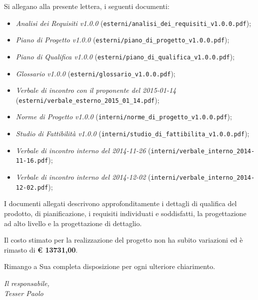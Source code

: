 \documentclass[10pt,a4paper,sans]{moderncv}        %
\begin{document}
Si allegano alla presente lettera, i seguenti documenti:
	\begin{itemize}
		\item \textit{Analisi dei Requisiti v1.0.0} ({\verb!esterni/analisi_dei_requisiti_v1.0.0.pdf!});
		\item \textit{Piano di Progetto v1.0.0} ({\verb!esterni/piano_di_progetto_v1.0.0.pdf!});
		\item \textit{Piano di Qualifica v1.0.0} ({\verb!esterni/piano_di_qualifica_v1.0.0.pdf!});
		\item \textit{Glossario v1.0.0} ({\verb!esterni/glossario_v1.0.0.pdf!});
		\item \textit{Verbale di incontro con il proponente del 2015-01-14} ({\verb!esterni/verbale_esterno_2015_01_14.pdf!});
		\item \textit{Norme di Progetto v1.0.0} ({\verb!interni/norme_di_progetto_v1.0.0.pdf!});
		\item \textit{Studio di Fattibilità v1.0.0} ({\verb!interni/studio_di_fattibilita_v1.0.0.pdf!});
		\item \textit{Verbale di incontro interno del 2014-11-26} ({\verb!interni/verbale_interno_2014-11-16.pdf!});
		\item \textit{Verbale di incontro interno del 2014-12-02} ({\verb!interni/verbale_interno_2014-12-02.pdf!});
	\end{itemize}
\noindent
I documenti allegati descrivono approfonditamente i dettagli di qualifica del prodotto, di pianificazione, i requisiti individuati e soddisfatti, la progettazione ad alto livello e la progettazione di dettaglio.

Il costo stimato per la realizzazione del progetto non ha subito variazioni ed è rimasto di \textbf{\euro{} 13731,00}.

Rimango a Sua completa disposizione per ogni ulteriore chiarimento.
	\begin{flushright}
		\textit{Il responsabile,}\\ 
		\textit{Tesser Paolo}
	\end{flushright}
\end{document}
